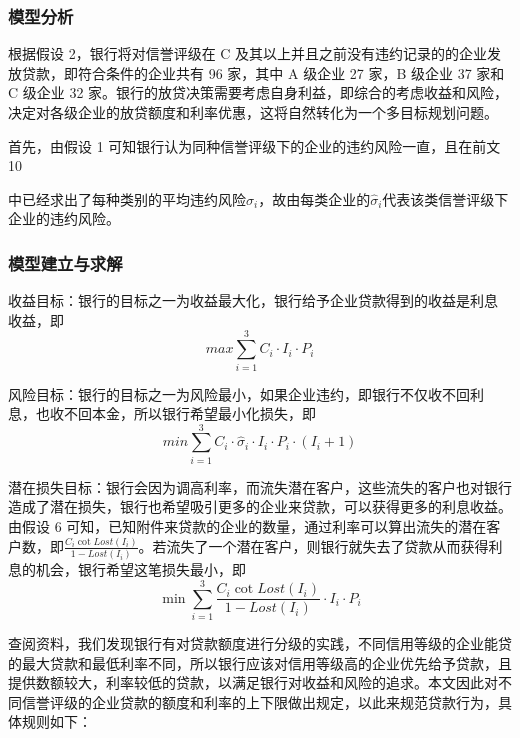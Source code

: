 \documentclass[UTF8]{ctexart}
\begin{document}
\subsubsection{模型分析}

根据假设 2，银行将对信誉评级在 C 及其以上并且之前没有违约记录的的企业发放贷款，即符合条件的企业共有 96 家，其中 A 级企业 27 家，B 级企业 37 家和 C 级企业 32 家。银行的放贷决策需要考虑自身利益，即综合的考虑收益和风险，决定对各级企业的放贷额度和利率优惠，这将自然转化为一个多目标规划问题。

首先，由假设 1 可知银行认为同种信誉评级下的企业的违约风险一直，且在前文
10

中已经求出了每种类别的平均违约风险$\hat \sigma_i $，故由每类企业的$\hat \sigma_i $代表该类信誉评级下企业的违约风险。

\subsubsection{模型建立与求解}

收益目标：银行的目标之一为收益最大化，银行给予企业贷款得到的收益是利息
收益，即
\begin{equation}
	max\sum_{i=1}^3 C_i \cdot I_i \cdot P_i
\end{equation}

风险目标：银行的目标之一为风险最小，如果企业违约，即银行不仅收不回利
息，也收不回本金，所以银行希望最小化损失，即
\begin{equation}
	min\sum_{i=1}^3 C_i \cdot \hat \sigma_i \cdot I_i \cdot P_i \cdot (I_i+1)
\end{equation}

潜在损失目标：银行会因为调高利率，而流失潜在客户，这些流失的客户也对银行造成了潜在损失，银行也希望吸引更多的企业来贷款，可以获得更多的利息收益。由假设 6 可知，已知附件来贷款的企业的数量，通过利率可以算出流失的潜在客户数，即$\frac{C_i \cot Lost(I_i)}{1-Lost(I_i)}$。若流失了一个潜在客户，则银行就失去了贷款从而获得利息的机会，银行希望这笔损失最小，即
\begin{equation}
	\min \sum_{i=1}^3 {\frac{C_i \cot Lost(I_i)}{1-Lost(I_i)}} \cdot I_i \cdot P_i
\end{equation}

查阅资料，我们发现银行有对贷款额度进行分级的实践，不同信用等级的企业能贷的最大贷款和最低利率不同，所以银行应该对信用等级高的企业优先给予贷款，且提供数额较大，利率较低的贷款，以满足银行对收益和风险的追求。本文因此对不同信誉评级的企业贷款的额度和利率的上下限做出规定，以此来规范贷款行为，具体规则如下：
\end{document}
